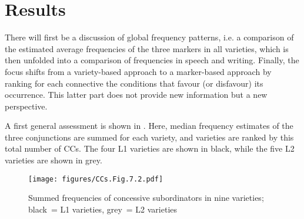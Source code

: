 \section{\label{bkm:Ref3905874}Results}\label{sec:7.3}

There will first be a discussion of global frequency patterns, i.e. a comparison of the estimated average frequencies of the three markers in all varieties, which is then unfolded into a comparison of frequencies in speech and writing. Finally, the focus shifts from a variety-based approach to a marker-based approach by ranking for each connective the conditions that favour (or disfavour) its occurrence. This latter part does not provide new information but a new perspective.

A first general assessment is shown in . Here, median frequency estimates of the three conjunctions are summed for each variety, and varieties are ranked by this total number of CCs. The four L1 varieties are shown in black, while the five L2 varieties are shown in grey.

\begin{figure}
\texttt{[image: figures/CCs.Fig.7.2.pdf]}
\caption{\label{bkm:Ref58235298}\label{fig:7.2}Summed frequencies of concessive subordinators in nine varieties; black~= L1 varieties, grey~= L2 varieties}
\end{figure}

